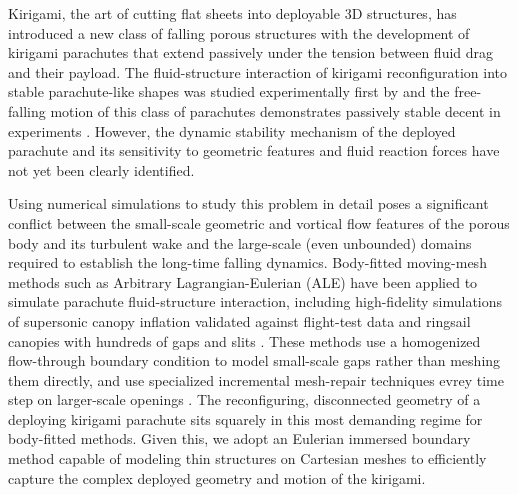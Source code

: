 \documentclass[lineno]{JFM-FLM_Au}
\begin{document}
Kirigami, the art of cutting flat sheets into deployable 3D structures, has introduced a new class of falling porous structures with the development of kirigami parachutes that extend passively under the tension between fluid drag and their payload.
The fluid-structure interaction of kirigami reconfiguration into stable parachute-like shapes was studied experimentally first by \cite{Carleton2024KirigamiFlow} and the free-falling motion of this class of parachutes demonstrates passively stable decent in experiments \citep{Lamoureux2025Kirigami-inspiredReconfiguration}. However, the dynamic stability mechanism of the deployed parachute and its sensitivity to geometric features and fluid reaction forces have not yet been clearly identified.

Using numerical simulations to study this problem in detail poses a significant conflict between the small-scale geometric and vortical flow features of the porous body and its turbulent wake and the large-scale (even unbounded) domains required to establish the long-time falling dynamics. Body-fitted moving-mesh methods such as Arbitrary Lagrangian-Eulerian (ALE) have been applied to simulate parachute fluid-structure interaction, including high-fidelity simulations of supersonic canopy inflation validated against flight-test data \citep{asad_sensitivity_2025} and ringsail canopies with hundreds of gaps and slits \citep{takizawa_fluid---structure_2012}. These methods use a homogenized flow-through boundary condition to model small-scale gaps rather than meshing them directly, and use specialized incremental mesh-repair techniques evrey time step on larger-scale openings \citep{takizawa_fluidstructure_2013}. The reconfiguring, disconnected geometry of a deploying kirigami parachute sits squarely in this most demanding regime for body-fitted methods. Given this, we adopt an Eulerian immersed boundary method capable of modeling thin structures on Cartesian meshes \citep{Lauber2022} to efficiently capture the complex deployed geometry and motion of the kirigami. 
\end{document}
